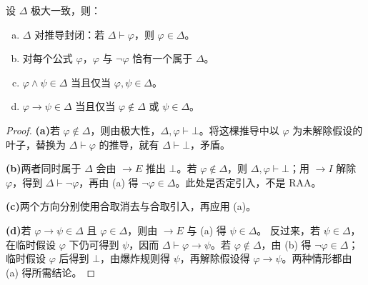 \documentclass[lang=cn,a4paper,fontset=none,zihao=false,10pt,openany,twoside]{beautybook}
\numberwithin{algorithm}{chapter}
\begin{document}
\begin{lemma}[极大一致集的性质]\label{lem:prop-maximal-properties}
设 $\Delta$ 极大一致，则：
\begin{enumerate}[(a)]
\item $\Delta$ 对推导封闭：若 $\Delta\vdash\varphi$，则 $\varphi\in\Delta$。
\item 对每个公式 $\varphi$，$\varphi$ 与 $\neg\varphi$ 恰有一个属于 $\Delta$。
\item $\varphi\wedge\psi\in\Delta$ 当且仅当 $\varphi,\psi\in\Delta$。
\item $\varphi\to\psi\in\Delta$ 当且仅当 $\varphi\notin\Delta$ 或 $\psi\in\Delta$。
\end{enumerate}
\end{lemma}
\begin{proof}
\par\smallskip\noindent\textbf{(a)}\quad 若 $\varphi\notin\Delta$，则由极大性，$\Delta,\varphi\vdash\bot$。将这棵推导中以 $\varphi$ 为未解除假设的叶子，替换为 $\Delta\vdash\varphi$ 的推导，就有 $\Delta\vdash\bot$，矛盾。

\par\smallskip\noindent\textbf{(b)}\quad 两者同时属于 $\Delta$ 会由 $\to E$ 推出 $\bot$。若 $\varphi\notin\Delta$，则 $\Delta,\varphi\vdash\bot$；用 $\to I$ 解除 $\varphi$，得到 $\Delta\vdash\neg\varphi$，再由 (a) 得 $\neg\varphi\in\Delta$。此处是否定引入，不是 RAA。

\par\smallskip\noindent\textbf{(c)}\quad 两个方向分别使用合取消去与合取引入，再应用 (a)。

\par\smallskip\noindent\textbf{(d)}\quad 若 $\varphi\to\psi\in\Delta$ 且 $\varphi\in\Delta$，则由 $\to E$ 与 (a) 得 $\psi\in\Delta$。
反过来，若 $\psi\in\Delta$，在临时假设 $\varphi$ 下仍可得到 $\psi$，因而 $\Delta\vdash\varphi\to\psi$。若 $\varphi\notin\Delta$，由 (b) 得 $\neg\varphi\in\Delta$；临时假设 $\varphi$ 后得到 $\bot$，由爆炸规则得 $\psi$，再解除假设得 $\varphi\to\psi$。两种情形都由 (a) 得所需结论。
\end{proof}
\end{document}
